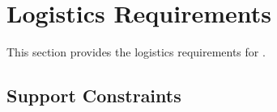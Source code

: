 \KNEADSECTIONNEWPAGE
\section{Logistics Requirements}
\label{lab:sec_Logistics}
% 

This section provides the logistics requirements for \ThisSys.

\KNEADSUBSECTIONNEWPAGE
\subsection{Support Constraints}
\label{lab:ssec_Logistics_SuportConstraints_CAP}






% 


